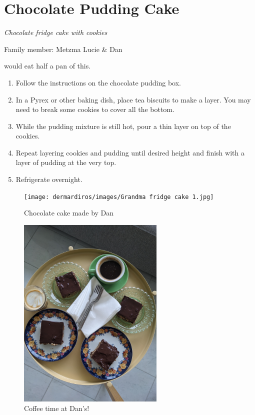 \chapter{Chocolate Pudding Cake}
\label{ch:chocolatefridgecake}
\textit{Chocolate fridge cake with cookies}

Family member: Metzma Lucie \& Dan


 would eat half a pan of this.
\bigskip

\begin{enumerate}
    \item Follow the instructions on the chocolate pudding box.
    \item In a Pyrex or other baking dish, place tea biscuits to make a layer. You may need to break some cookies to cover all the bottom.
    \item While the pudding mixture is still hot, pour a thin layer on top of the cookies.
    \item Repeat layering cookies and pudding until desired height and finish with a layer of pudding at the very top.
    \item Refrigerate overnight.
\end{enumerate}

\begin{figure}
  \texttt{[image: dermardiros/images/Grandma fridge cake 1.jpg]}
  \caption{Chocolate cake made by Dan}
  \includegraphics[width=70mm]{dermardiros/images/Grandma fridge cake 2.jpg}
  \caption{Coffee time at Dan's!}
\end{figure}